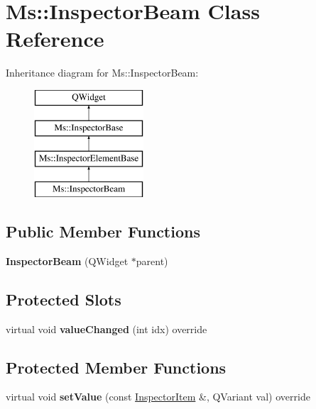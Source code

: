 \hypertarget{class_ms_1_1_inspector_beam}{}\section{Ms\+:\+:Inspector\+Beam Class Reference}
\label{class_ms_1_1_inspector_beam}
Inheritance diagram for Ms\+:\+:Inspector\+Beam\+:\begin{figure}[H]
\begin{center}
\leavevmode
\includegraphics[height=4.000000cm]{class_ms_1_1_inspector_beam}
\end{center}
\end{figure}
\subsection*{Public Member Functions}
\begin{DoxyCompactItemize}
\item 
\mbox{\label{class_ms_1_1_inspector_beam_ab26bf5b041291aa13d966e0386c48ddd}} 
{\bfseries Inspector\+Beam} (Q\+Widget $\ast$parent)
\end{DoxyCompactItemize}
\subsection*{Protected Slots}
\begin{DoxyCompactItemize}
\item 
\mbox{\label{class_ms_1_1_inspector_beam_a503dad05ffc34d233e2f724e7099e8ae}} 
virtual void {\bfseries value\+Changed} (int idx) override
\end{DoxyCompactItemize}
\subsection*{Protected Member Functions}
\begin{DoxyCompactItemize}
\item 
\mbox{\label{class_ms_1_1_inspector_beam_a5d10a4e227d54600e4460cf56545963f}} 
virtual void {\bfseries set\+Value} (const \hyperlink{struct_ms_1_1_inspector_item}{Inspector\+Item} \&, Q\+Variant val) override
\end{DoxyCompactItemize}
